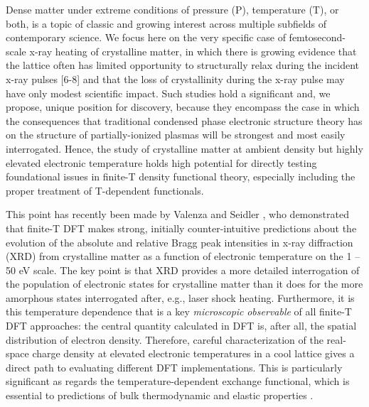 Dense matter under extreme conditions of pressure (P), temperature (T),
or both, is a topic of classic and growing interest across multiple
subfields of contemporary science. \cite{drake2006high, krishnan1998structure, fortney2009frontiers, glenzer2009x, national2003high} We focus here on the very
specific case of femtosecond-scale x-ray heating of crystalline matter,
in which there is growing evidence that the lattice often has limited
opportunity to structurally relax during the incident x-ray pulses
{[}6-8{]} and that the loss of crystallinity during the x-ray pulse may
have only modest scientific impact. \cite{caleman2015ultrafast} Such studies hold a
significant and, we propose, unique position for discovery, because they
encompass the case in which the consequences that traditional condensed
phase electronic structure theory has on the structure of
partially-ionized plasmas will be strongest and most easily
interrogated. Hence, the study of crystalline matter at ambient density
but highly elevated electronic temperature holds high potential for
directly testing foundational issues in finite-T density functional
theory, especially including the proper treatment of T-dependent
functionals. \cite{karasiev2012generalized, karasiev2012comparison, valenza2016warm}

This point has recently been made by Valenza and Seidler \cite{valenza2016warm}, who
demonstrated that finite-T DFT makes strong, initially counter-intuitive
predictions about the evolution of the absolute and relative Bragg peak
intensities in x-ray diffraction (XRD) from crystalline matter as a
function of electronic temperature on the 1 -- 50 eV scale. The key
point is that XRD provides a more detailed interrogation of the
population of electronic states for crystalline matter than it does for
the more amorphous states interrogated after, e.g., laser shock heating.
Furthermore, it is this temperature dependence that is a key
\emph{microscopic} \emph{observable} of all finite-T DFT approaches: the
central quantity calculated in DFT is, after all, the spatial
distribution of electron density. Therefore, careful characterization of
the real-space charge density at elevated electronic temperatures in a
cool lattice gives a direct path to evaluating different DFT
implementations. This is particularly significant as regards the
temperature-dependent exchange functional, which is essential to
predictions of bulk thermodynamic and elastic properties \cite{karasiev2012generalized, karasiev2012comparison, bredow2000effect}.

